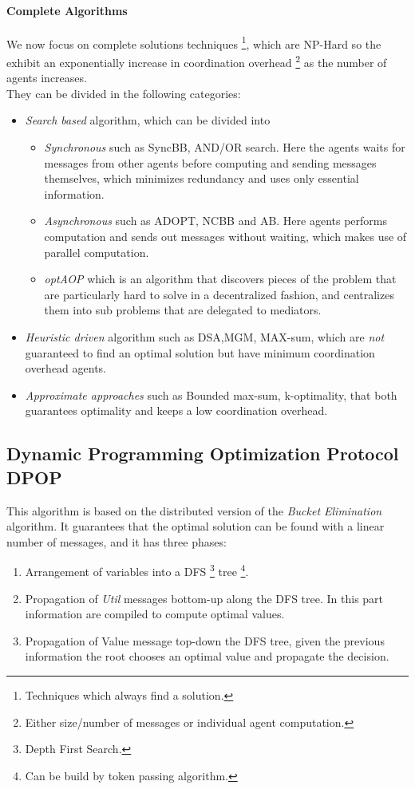 \documentclass[10pt,a4paper]{article}
\begin{document}
\paragraph{Complete Algorithms}
We now focus on complete solutions techniques \footnote{Techniques which always find a solution.}, which are NP-Hard so the exhibit an exponentially increase in coordination overhead \footnote{Either size/number of messages or individual agent computation.} as the number of agents increases.\\
They can be divided in the following categories:
\begin{itemize}
\item \textit{Search based} algorithm, which can be divided into

	\begin{itemize}
	\item \textit{Synchronous} such as SyncBB, AND/OR search. Here the agents waits for messages from other agents before computing and sending messages themselves, which minimizes redundancy and uses only essential information.
	\item \textit{Asynchronous} such as ADOPT, NCBB and AB. Here agents performs computation and sends out messages without waiting, which makes use of parallel computation.
	\item \textit{optAOP} which is an algorithm that discovers pieces of the problem that are particularly hard to solve in a decentralized fashion, and centralizes them into sub problems that are delegated to mediators.
	\end{itemize}

\item \textit{Heuristic driven}  algorithm such as DSA,MGM, MAX-sum, which are \textit{not} guaranteed to find an optimal solution but have minimum coordination overhead
 agents.
 \item \textit{Approximate approaches}  such as Bounded max-sum, k-optimality, that both guarantees optimality and keeps a low coordination overhead.
\end{itemize}

\subsection{Dynamic Programming Optimization Protocol DPOP}
This algorithm is based on the distributed version of the \textit{Bucket Elimination} algorithm. It guarantees that the optimal solution can be found with a linear number of messages, and it has three phases:
\begin{enumerate}
\item Arrangement of variables into a DFS \footnote{Depth First Search.} tree \footnote{Can be build by token passing algorithm.}.
\item Propagation of \textit{Util} messages bottom-up along the DFS tree. In this part information are compiled to compute optimal values.
\item Propagation of Value message top-down the DFS tree, given the previous information the root chooses an optimal value and propagate the decision.
\end{enumerate}
\end{document}
